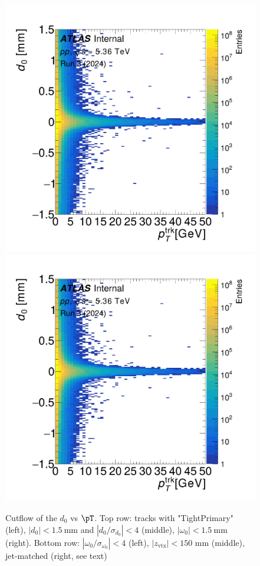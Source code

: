 \begin{figure}[h]
    \includegraphics[width=0.32\linewidth]{images/d0_vs_pt_almost_all_h2d_d0_vs_pt_cut6_.png}
    \includegraphics[width=0.32\linewidth]{images/d0_vs_pt_almost_all_h2d_d0_vs_pt_cut7_.png}
    \caption{Cutflow of the $d_0$ vs $\pT$. Top row: tracks with "TightPrimary" (left), $|d_0|<\qty{1.5}{\mm}$  and $|d_0/\sigma_{d_0}| < 4$ (middle), $|\omega_0|<\qty{1.5}{\mm}$ (right). Bottom row: $|\omega_0/\sigma_{\omega_0}| < 4$ (left), $|z_\text{vtx}|<150$ mm (middle), jet-matched (right, see text)}
    \label{fig:cutflow_d0}
\end{figure}

